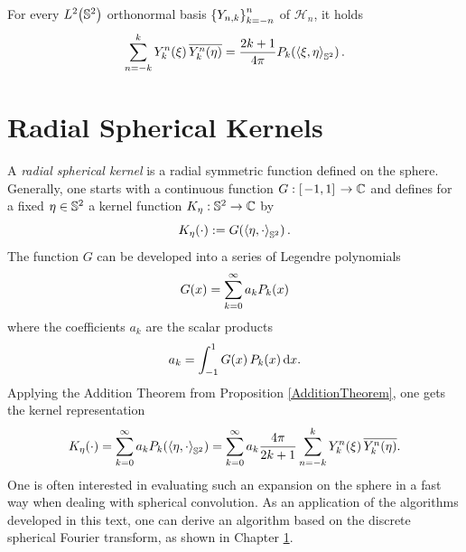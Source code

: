 \begin{proposition}
  \label{AdditionTheorem}
  For every $L^2{\hspace{-0.4ex}}\left(\mathbb{S}^2\right)$ orthonormal basis 
  $\left\{Y_{n,k}\right\rbrace_{k=-n}^{n}$ of $\mathcal{H}_n$, it holds
  \begin{equation}
    \nonumber
    \sum_{n=-k}^{k} Y_{k}^n{\hspace{-0.4ex}}\left(\mathbf{\xi}\right) \overline{Y_{k}^n{\hspace{-0.4ex}}\left(\mathbf{\eta}\right)} =
    \frac{2k+1}{4\pi}P_k{\hspace{-0.4ex}}\left(\left<\mathbf{\xi},\mathbf{\eta}\right>_{\mathbb{S}^2}\right).
  \end{equation}
\end{proposition}

\section{Radial Spherical Kernels}
A \emph{radial spherical kernel} is a radial symmetric function defined on the sphere. 
Generally, one starts with a continuous function $G: \left[\left.-1,1\right]\right. \rightarrow \mathbb{C}$ and defines 
for a fixed $\mathbf{\eta} \in \mathbb{S}^2$ a kernel function $K_{\mathbf{\eta}}: \mathbb{S}^2 \rightarrow \mathbb{C}$ by
$$ K_{\mathbf{\eta}}{\hspace{-0.4ex}}\left(\cdot\right) := G{\hspace{-0.4ex}}\left(\left<\eta,\mathbf{\cdot}\right>_{\mathbb{S}^2}\right).$$
The function $G$ can be developed into a series of Legendre polynomials
$$ G{\hspace{-0.4ex}}\left(x\right) = \sum_{k = 0}^{\infty} a_k P_k{\hspace{-0.4ex}}\left(x\right)$$
where the coefficients $a_k$ are the scalar products
$$ a_k = \int_{-1}^{1} G{\hspace{-0.4ex}}\left(x\right) P_k{\hspace{-0.4ex}}\left(x\right) \text{\rm{d}} x.$$
Applying the Addition Theorem from Proposition \ref{AdditionTheorem}, one gets the kernel 
representation
$$K_{\mathbf{\eta}}{\hspace{-0.4ex}}\left(\cdot\right) = \sum_{k = 0}^{\infty} a_k P_k{\hspace{-0.4ex}}\left(\left<\mathbf{\eta},\cdot\right>_{\mathbb{S}^2}\right) =  
\sum_{k = 0}^{\infty} a_k \frac{4\pi}{2k+1} \sum_{n=-k}^k Y_{k}^n{\hspace{-0.4ex}}\left(\mathbf{\xi}\right) \overline{Y_{k}^n{\hspace{-0.4ex}}\left(\mathbf{\eta}\right)}.$$
One is often interested in evaluating such an expansion on the sphere in a fast way when dealing with 
spherical convolution. As an application of the algorithms developed in this text, one can derive 
an algorithm based on the discrete spherical Fourier transform, as shown in Chapter \ref{}.

